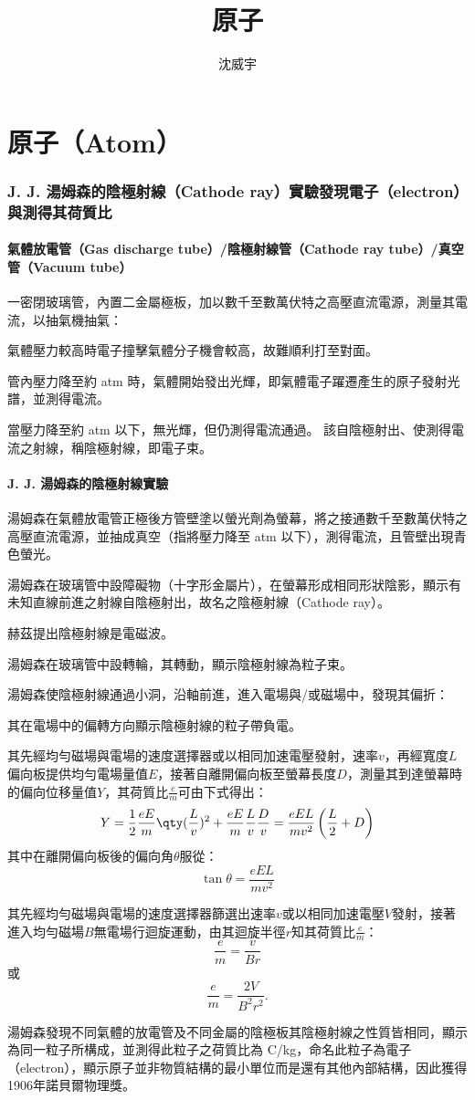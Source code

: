 \documentclass[a4paper,12pt]{report}
\begin{document}
\title{原子}
\author{沈威宇}
\date{\temtoday}
\titletocdoc
\chapter{原子（Atom）}
\subsection{J. J. 湯姆森的陰極射線（Cathode ray）實驗發現電子（electron）與測得其荷質比}
\subsubsection{氣體放電管（Gas discharge tube）/陰極射線管（Cathode ray tube）/真空管（Vacuum tube）}
一密閉玻璃管，內置二金屬極板，加以數千至數萬伏特之高壓直流電源，測量其電流，以抽氣機抽氣：
\bit
\item 氣體壓力較高時電子撞擊氣體分子機會較高，故難順利打至對面。
\item 管內壓力降至約  atm 時，氣體開始發出光輝，即氣體電子躍遷產生的原子發射光譜，並測得電流。
\item 當壓力降至約  atm 以下，無光輝，但仍測得電流通過。
\eit
該自陰極射出、使測得電流之射線，稱陰極射線，即電子束。
\subsubsection{J. J. 湯姆森的陰極射線實驗}
\bit
\item 湯姆森在氣體放電管正極後方管壁塗以螢光劑為螢幕，將之接通數千至數萬伏特之高壓直流電源，並抽成真空（指將壓力降至 atm 以下），測得電流，且管壁出現青色螢光。
\item 湯姆森在玻璃管中設障礙物（十字形金屬片），在螢幕形成相同形狀陰影，顯示有未知直線前進之射線自陰極射出，故名之陰極射線（Cathode ray）。
\item 赫茲提出陰極射線是電磁波。
\item 湯姆森在玻璃管中設轉輪，其轉動，顯示陰極射線為粒子束。
\item 湯姆森使陰極射線通過小洞，沿軸前進，進入電場與/或磁場中，發現其偏折：
\bit
\item 其在電場中的偏轉方向顯示陰極射線的粒子帶負電。
\item 其先經均勻磁場與電場的速度選擇器或以相同加速電壓發射，速率$v$，再經寬度$L$偏向板提供均勻電場量值$E$，接著自離開偏向板至螢幕長度$D$，測量其到達螢幕時的偏向位移量值$Y$，其荷質比$\frac{e}{m}$可由下式得出：
\[Y=\frac{1}{2}\frac{eE}{m}\qty(\frac{L}{v})^2+\frac{eE}{m}\frac{L}{v}\frac{D}{v}=\frac{eEL}{mv^2}\left(\frac{L}{2}+D\right)\]
其中在離開偏向板後的偏向角$\theta$服從：
\[\tan\theta=\frac{eEL}{mv^2}\]
\item 其先經均勻磁場與電場的速度選擇器篩選出速率$v$或以相同加速電壓$V$發射，接著進入均勻磁場$B$無電場行迴旋運動，由其迴旋半徑$r$知其荷質比$\frac{e}{m}$：
\[\frac{e}{m}=\frac{v}{Br}\]
或
\[\frac{e}{m}=\frac{2V}{B^2r^2}.\]
\eit
\item 湯姆森發現不同氣體的放電管及不同金屬的陰極板其陰極射線之性質皆相同，顯示為同一粒子所構成，並測得此粒子之荷質比為 C/kg，命名此粒子為電子（electron），顯示原子並非物質結構的最小單位而是還有其他內部結構，因此獲得1906年諾貝爾物理獎。
\eit
\end{document}
